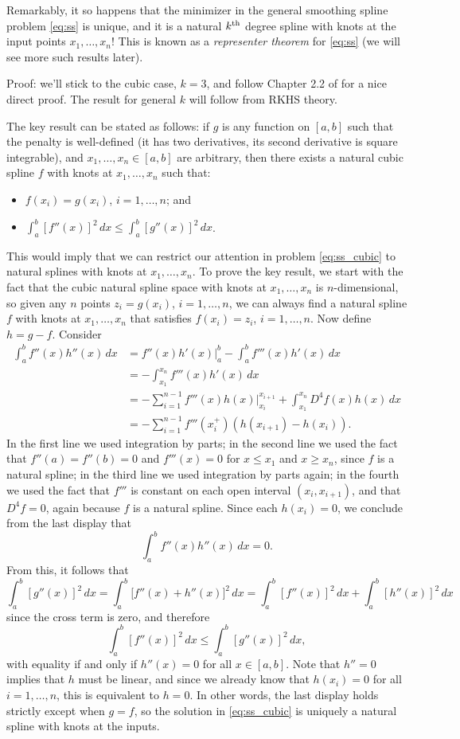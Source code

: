 \documentclass{article}
\begin{document}
Remarkably, it so happens that the minimizer in the general smoothing spline
problem \eqref{eq:ss} is unique, and it is a natural $k^{\text{th}}$ degree spline with 
knots at the input points $x_1,\dots,x_n$! This is known as a \emph{representer
  theorem} for \eqref{eq:ss} (we will see more such results later). 

Proof: we'll stick to the cubic case, $k=3$, and follow Chapter 2.2 of
\citet{green1993nonparametric} for a nice direct proof. The result for general
$k$ will follow from RKHS theory.  

The key result can be stated as follows: if $g$ is any function on $[a,b]$ such
that the penalty is well-defined (it has two derivatives, its second derivative
is square integrable), and $x_1,\dots,x_n \in [a,b]$ are arbitrary, then there
exists a natural cubic spline $f$ with knots at $x_1,\dots,x_n$ such that: 
\begin{itemize}
\item $f(x_i) = g(x_i)$, $i=1,\dots,n$; and 
\item $\int_a^b [f''(x)]^2 \, dx \leq \int_a^b [g''(x)]^2 \, dx$.
\end{itemize}
This would imply that we can restrict our attention in problem
\eqref{eq:ss_cubic} to natural splines with knots at $x_1,\dots,x_n$. To prove
the key result, we start with the fact that the cubic natural spline space with
knots at $x_1,\dots,x_n$ is $n$-dimensional, so given any $n$ points $z_i =
g(x_i)$, $i=1,\dots,n$, we can always find a natural spline $f$ with knots at
$x_1,\dots,x_n$ that satisfies $f(x_i) = z_i$, $i=1,\dots,n$. Now define $h =
g-f$. Consider 
\begin{align*}
\int_a^b f''(x) h''(x) \, dx 
&= f''(x) h'(x) \Big|_a^b - \int_a^b f'''(x) h'(x) \, dx \\
&= -\int_{x_1}^{x_n} f'''(x) h'(x) \, dx \\ 
&= -\sum_{i=1}^{n-1} f'''(x) h(x) \Big|_{x_i}^{x_{i+1}} +  
\int_{x_1}^{x_n} D^4 f(x) h(x) \, dx \\
&= -\sum_{i=1}^{n-1} f'''(x_i^+) (h(x_{i+1}) - h(x_i)).
\end{align*}
In the first line we used integration by parts; in the second line we used the
fact that $f''(a) = f''(b) = 0$ and $f'''(x)=0$ for $x \leq x_1$ and $x \geq
x_n$, since $f$ is a natural spline; in the third line we used integration by
parts again; in the fourth we used the fact that $f'''$ is constant on each open
interval $(x_i,x_{i+1})$, and that $D^4 f=0$, again because $f$ is a natural
spline. Since each $h(x_i)=0$, we conclude from the last display that
\[
\int_a^b f''(x) h''(x) \, dx = 0.
\]
From this, it follows that
\[
\int_a^b [g''(x)]^2 \, dx 
= \int_a^b \big[ f''(x) + h''(x) \big]^2 \, dx 
= \int_a^b [f''(x)]^2 \, dx + \int_a^b [h''(x)]^2 \, dx
\]
since the cross term is zero, and therefore 
\[
\int_a^b [f''(x)]^2 \, dx \leq \int_a^b [g''(x)]^2 \, dx,
\]
with equality if and only if $h''(x)=0$ for all $x \in [a,b]$. Note that $h''=0$
implies that $h$ must be linear, and since we already know that $h(x_i)=0$ for
all $i=1,\dots,n$, this is equivalent to $h=0$. In other words, the last display
holds strictly except when $g=f$, so the solution in \eqref{eq:ss_cubic} is
uniquely a natural spline with knots at the inputs. 
\end{document}
